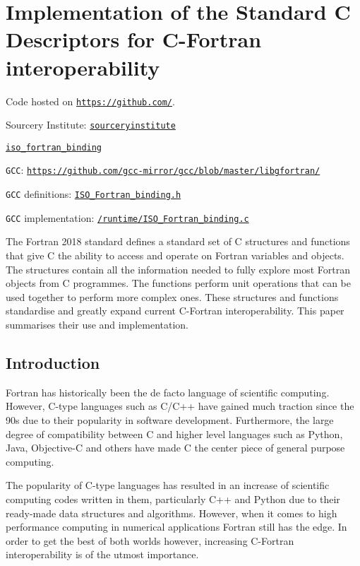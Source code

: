 \chapter{Implementation of the Standard C Descriptors for C-Fortran interoperability}\label{c:isocbinding}

Code hosted on \href{https://github.comhttps://github.com/}{\texttt{https://github.com/}}.

\noindent Sourcery Institute: \href{https://github.com/sourceryinstitute/}{\texttt{sourceryinstitute}}

\noindent\href{https://github.com/sourceryinstitute/iso_Fortran_binding/}{\texttt{iso\_fortran\_binding}}

\noindent\texttt{GCC}: \href{https://github.com/gcc-mirror/gcc/blob/master/libgfortran/}{\texttt{https://github.com/gcc-mirror/gcc/blob/master/libgfortran/}}

\noindent \texttt{GCC} definitions: \href{https://github.com/gcc-mirror/gcc/blob/master/libgfortran/ISO_Fortran_binding.h}{\texttt{ISO\_Fortran\_binding.h}}

\noindent\texttt{GCC} implementation: \href{https://github.com/gcc-mirror/gcc/blob/master/libgfortran/runtime/ISO_Fortran_binding.c}{\texttt{/runtime/ISO\_Fortran\_binding.c}}

The Fortran 2018 standard \cite{fortran} defines a standard set of C structures and functions that give C the ability to access and operate on Fortran variables and objects. The structures contain all the information needed to fully explore most Fortran objects from C programmes. The functions perform unit operations that can be used together to perform more complex ones. These structures and functions standardise and greatly expand current C-Fortran interoperability. This paper summarises their use and implementation.

\section{Introduction}

Fortran has historically been the de facto language of scientific computing. However, C-type languages such as C/C++ have gained much traction since the 90s due to their popularity in software development. Furthermore, the large degree of compatibility between C and higher level languages such as Python, Java, Objective-C and others have made C the center piece of general purpose computing.

The popularity of C-type languages has resulted in an increase of scientific computing codes written in them, particularly C++ and Python due to their ready-made data structures and algorithms. However, when it comes to high performance computing in numerical applications Fortran still has the edge. In order to get the best of both worlds however, increasing C-Fortran interoperability is of the utmost importance.

